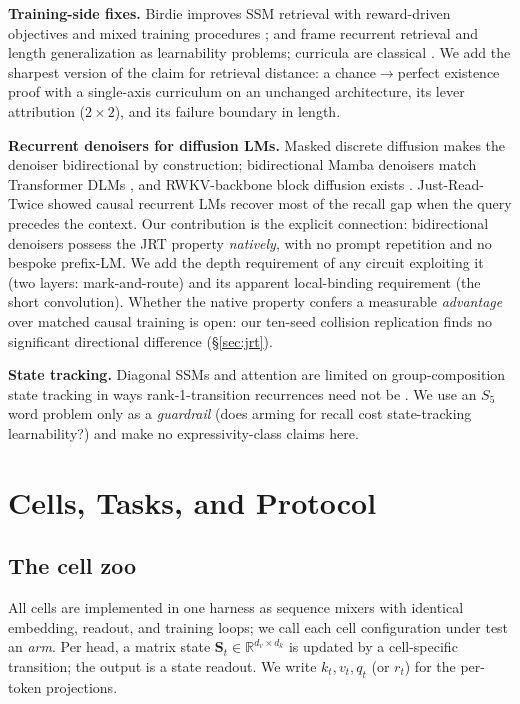 \documentclass{article}
\newcommand{\R}{\mathbb{R}}
\newcommand{\dkey}{d_k}
\newcommand{\dval}{d_v}
\newcommand{\St}{\mathbf{S}_t}
\begin{document}
\textbf{Training-side fixes.} Birdie improves SSM retrieval with reward-driven objectives and mixed training procedures \citep{blouir2024birdie}; \citet{okpekpe2025recall} and \citet{lengthgen2025} frame recurrent retrieval and length generalization as learnability problems; curricula are classical \citep{bengio2009curriculum}. We add the sharpest version of the claim for retrieval distance: a chance$\to$perfect existence proof with a single-axis curriculum on an unchanged architecture, its lever attribution ($2{\times}2$), and its failure boundary in length.

\textbf{Recurrent denoisers for diffusion LMs.} Masked discrete diffusion \citep{austin2021d3pm,sahoo2024mdlm} makes the denoiser bidirectional by construction; bidirectional Mamba denoisers match Transformer DLMs \citep{singh2025diffumamba}, and RWKV-backbone block diffusion exists \citep{b3drwkv2026}. Just-Read-Twice \citep{arora2024jrt} showed causal recurrent LMs recover most of the recall gap when the query precedes the context. Our contribution is the explicit connection: bidirectional denoisers possess the JRT property \emph{natively}, with no prompt repetition and no bespoke prefix-LM. We add the depth requirement of any circuit exploiting it (two layers: mark-and-route) and its apparent local-binding requirement (the short convolution). Whether the native property confers a measurable \emph{advantage} over matched causal training is open: our ten-seed collision replication finds no significant directional difference (\S\ref{sec:jrt}).

\textbf{State tracking.} Diagonal SSMs and attention are limited on group-composition state tracking in ways rank-1-transition recurrences need not be \citep{merrill2024illusion,grazzi2025negative,liu2023shortcuts,deletang2023chomsky}. We use an $S_5$ word problem only as a \emph{guardrail} (does arming for recall cost state-tracking learnability?) and make no expressivity-class claims here.

\section{Cells, Tasks, and Protocol}\label{sec:setup}

\subsection{The cell zoo}\label{sec:cells}

All cells are implemented in one harness as sequence mixers with identical embedding, readout, and training loops; we call each cell configuration under test an \emph{arm}. Per head, a matrix state $\St \in \R^{\dval\times\dkey}$ is updated by a cell-specific transition; the output is a state readout. We write $k_t, v_t, q_t$ (or $r_t$) for the per-token projections.
\end{document}
